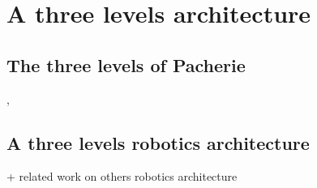 \documentclass[english,a4paper,11pt,twoside]{StyleThese}
\begin{document}
\section{A three levels architecture}

\subsection{The three levels of Pacherie}

\cite{pacherie2008phenomenology}, \cite{pacherie2011phenomenology}

\subsection{A three levels robotics architecture}

+ related work on others robotics architecture


\ifdefined{}
\else


\end{document}
